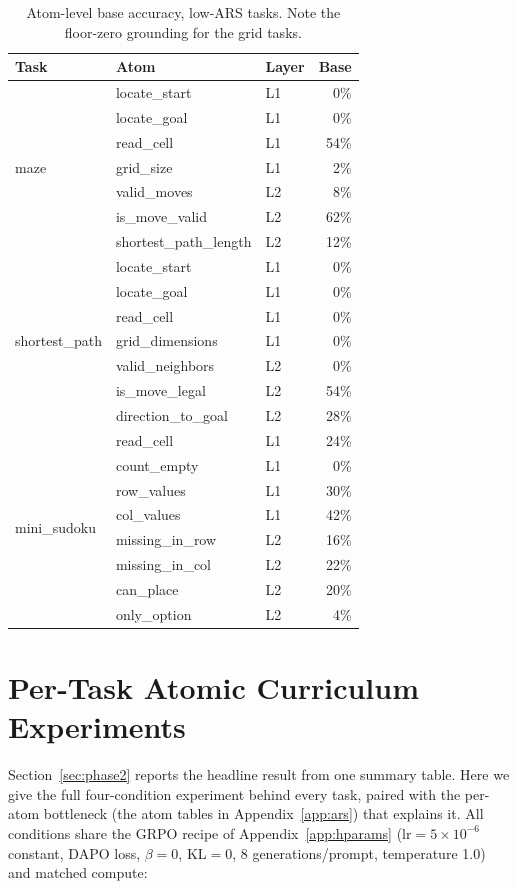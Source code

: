 \documentclass{article}
\begin{document}
\begin{table}[h]
\centering\small
\caption{Atom-level base accuracy, low-ARS tasks. Note the floor-zero grounding for the grid tasks.}
\begin{tabular}{lllr}
\toprule
Task & Atom & Layer & Base\\
\midrule
\multirow{7}{*}{maze}
 & locate\_start         & L1 & 0\%\\
 & locate\_goal          & L1 & 0\%\\
 & read\_cell            & L1 & 54\%\\
 & grid\_size            & L1 & 2\%\\
 & valid\_moves          & L2 & 8\%\\
 & is\_move\_valid       & L2 & 62\%\\
 & shortest\_path\_length& L2 & 12\%\\
\midrule
\multirow{7}{*}{shortest\_path}
 & locate\_start         & L1 & 0\%\\
 & locate\_goal          & L1 & 0\%\\
 & read\_cell            & L1 & 0\%\\
 & grid\_dimensions      & L1 & 0\%\\
 & valid\_neighbors      & L2 & 0\%\\
 & is\_move\_legal       & L2 & 54\%\\
 & direction\_to\_goal   & L2 & 28\%\\
\midrule
\multirow{8}{*}{mini\_sudoku}
 & read\_cell            & L1 & 24\%\\
 & count\_empty          & L1 & 0\%\\
 & row\_values           & L1 & 30\%\\
 & col\_values           & L1 & 42\%\\
 & missing\_in\_row      & L2 & 16\%\\
 & missing\_in\_col      & L2 & 22\%\\
 & can\_place            & L2 & 20\%\\
 & only\_option          & L2 & 4\%\\
\bottomrule
\end{tabular}
\end{table}

\clearpage

\section{Per-Task Atomic Curriculum Experiments}
\label{app:atomic}
Section~\ref{sec:phase2} reports the headline result from one summary table. Here we give the
full four-condition experiment behind every task, paired with the per-atom bottleneck (the atom
tables in Appendix~\ref{app:ars}) that explains it. All conditions share the GRPO recipe of
Appendix~\ref{app:hparams} ($\mathrm{lr}{=}5\!\times\!10^{-6}$ constant, DAPO loss, $\beta{=}0$,
KL${=}0$, 8 generations/prompt, temperature 1.0) and matched compute:
\end{document}
